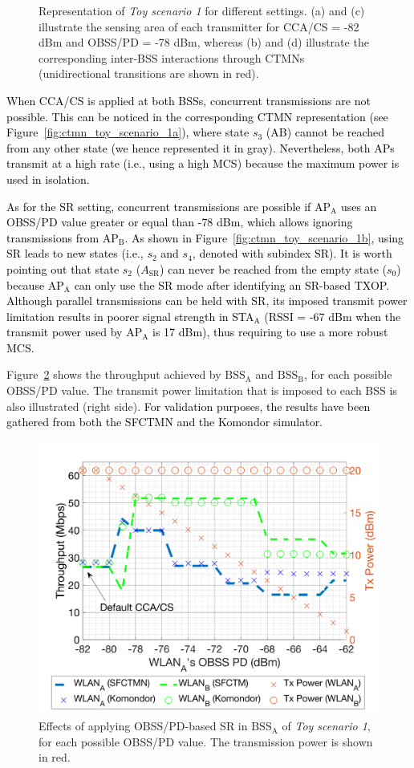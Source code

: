 \documentclass[preprint,12pt]{elsarticle}
\theoremstyle{plain}
\begin{document}
\begin{figure}[h!]
	\caption{Representation of \emph{Toy scenario 1} for different settings. (a) and (c) illustrate the sensing area of each transmitter for CCA/CS = -82 dBm and OBSS/PD = -78 dBm, whereas (b) and (d) illustrate the corresponding inter-BSS interactions through CTMNs (unidirectional transitions are shown in red).}
	\label{fig:toy_scenario_1b}
\end{figure}

\textcolor{black}{When CCA/CS is applied at both BSSs, concurrent transmissions are not possible. This can be noticed in the corresponding CTMN representation (see Figure~\ref{fig:ctmn_toy_scenario_1a}), where state $s_3$ (AB) cannot be reached from any other state (we hence represented it in gray). Nevertheless, both APs transmit at a high rate (i.e., using a high MCS) because the maximum power is used in isolation.} 

\textcolor{black}{As for the SR setting, concurrent transmissions are possible if $\text{AP}_\text{A}$ uses an OBSS/PD value greater or equal than -78 dBm, \textcolor{black}{which allows ignoring transmissions} from $\text{AP}_\text{B}$. As shown in Figure~\ref{fig:ctmn_toy_scenario_1b}, using SR leads to new states (i.e., $s_2$ and $s_4$, denoted with subindex $\text{SR}$). It is worth pointing out that state $s_2$ ($A_\text{SR}$) can never be reached from the empty state ($s_0$) because $\text{AP}_\text{A}$ can only use the SR mode after identifying an SR-based TXOP. Although parallel transmissions can be held with SR, its imposed transmit power limitation results in poorer signal strength in STA$_\text{A}$ (RSSI = -67 dBm when the transmit power used by AP$_\text{A}$ is 17 dBm), thus requiring to use a more robust MCS.}

Figure~\ref{fig:toy_scenario_1_results} shows the throughput achieved by $\text{BSS}_\text{A}$ and $\text{BSS}_\text{B}$, for each possible OBSS/PD value. The transmit power limitation that is imposed to each BSS is also illustrated (right side). \textcolor{black}{For validation purposes, the results have been gathered from both the SFCTMN and the Komondor simulator. }

\begin{figure}[ht!]
	\centering
	\includegraphics[width=.5\columnwidth]{SIM_1_1}
	\caption{Effects of applying OBSS/PD-based SR in $\text{BSS}_\text{A}$ of \emph{Toy scenario 1}, for each possible OBSS/PD value. The transmission power is shown in red.}		
	\label{fig:toy_scenario_1_results}
\end{figure}
\end{document}

